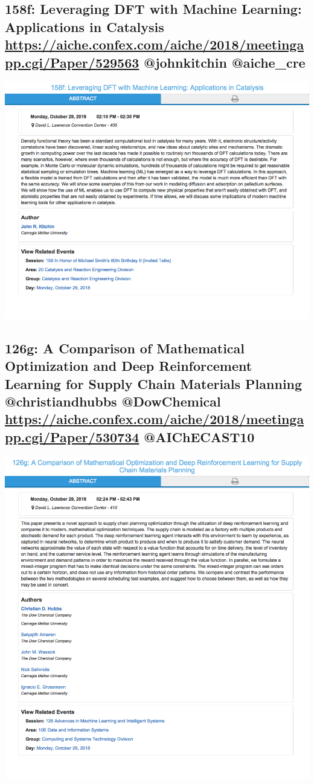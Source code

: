 \documentclass[11pt]{article}
\begin{document}
\subsection{158f: Leveraging DFT with Machine Learning: Applications in Catalysis \url{https://aiche.confex.com/aiche/2018/meetingapp.cgi/Paper/529563} @johnkitchin @aiche\_cre}
\label{sec:orgd7c2fd6}
\begin{center}
\includegraphics[width=.9\linewidth]{./529563.png}
\end{center}
\subsection{126g: A Comparison of Mathematical Optimization and Deep Reinforcement Learning for Supply Chain Materials Planning  @christiandhubbs @DowChemical \url{https://aiche.confex.com/aiche/2018/meetingapp.cgi/Paper/530734} @AIChECAST10}
\label{sec:org897cc8b}
\begin{center}
\includegraphics[width=.9\linewidth]{./530734.png}
\end{center}
\end{document}
